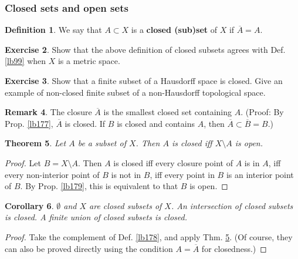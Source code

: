 \documentclass[12pt,b5paper,notitlepage]{article}
\theoremstyle{definition}
\newtheorem{df}{Definition}[section]
\newtheorem{exe}[df]{Exercise}
\newtheorem{rem}[df]{Remark}
\theoremstyle{plain}
\newtheorem{thm}[df]{Theorem}
\newtheorem{co}[df]{Corollary}
\newcommand{\ovl}{\overline}
\numberwithin{equation}{section}
\begin{document}
\subsubsection{Closed sets and open sets}\label{lb228}


\begin{df}
We say that $A\subset X$ is a \textbf{closed (sub)set}  of $X$ if $\ovl A=A$.
\end{df}

\begin{exe}
Show that the above definition of closed subsets agrees with Def. \ref{lb99} when $X$ is a metric space.
\end{exe}

\begin{exe}
Show that a finite subset of a Hausdorff space is closed. Give an example of non-closed finite subset of a non-Hausdorff topological space.
\end{exe}


\begin{rem}\label{lb242}
The closure $\ovl A$ is the smallest closed set containing $A$. (Proof: By Prop. \ref{lb177},  $\ovl A$ is closed. If $B$ is closed and contains $A$, then $\ovl A\subset\ovl B=B$.)
\end{rem}



\begin{thm}\label{lb181}
Let $A$ be a subset of $X$. Then $A$ is closed iff $X\setminus A$ is open.
\end{thm}

\begin{proof}
Let $B=X\setminus A$. Then $A$ is closed iff every closure point of $A$ is in $A$, iff every non-interior point of $B$ is not in $B$, iff every point in $B$ is an interior point of $B$. By Prop. \ref{lb179}, this is equivalent to that $B$ is open.
\end{proof}

\begin{co}\label{lb186}
$\emptyset$ and $X$ are closed subsets of $X$. An intersection of closed subsets is closed. A finite union of closed subsets is closed. 
\end{co}

\begin{proof}
Take the complement of Def. \ref{lb178}, and apply Thm. \ref{lb181}. (Of course, they can also be proved directly using the condition $A=\ovl A$ for closedness.)
\end{proof}
\end{document}
